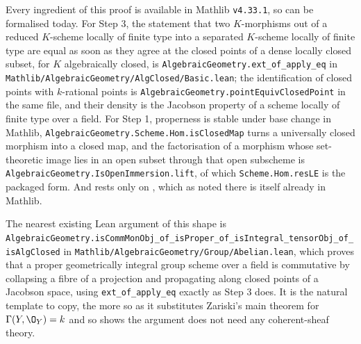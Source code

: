 \begin{remark}\label{rem:cube-rigidity-mathlib}
Every ingredient of this proof is available in Mathlib \texttt{v4.33.1}, so
 can be formalised today.  For Step 3, the statement
that two $K$-morphisms out of a reduced $K$-scheme locally of finite type into
a separated $K$-scheme locally of finite type are equal as soon as they agree
at the closed points of a dense locally closed subset, for $K$ algebraically
closed, is \texttt{AlgebraicGeometry.ext\_of\_apply\_eq} in
\texttt{Mathlib/AlgebraicGeometry/AlgClosed/Basic.lean}; the identification of
closed points with $k$-rational points is
\texttt{AlgebraicGeometry.pointEquivClosedPoint} in the same file, and their
density is the Jacobson property of a scheme locally of finite type over a
field.  For Step 1, properness is stable under base change in Mathlib,
\texttt{AlgebraicGeometry.Scheme.Hom.isClosedMap} turns a universally closed
morphism into a closed map, and the factorisation of a morphism whose
set-theoretic image lies in an open subset through that open subscheme is
\texttt{AlgebraicGeometry.IsOpenImmersion.lift}, of which
\texttt{Scheme.Hom.resLE} is the packaged form.  And
 rests only on
, which as noted there is itself already in
Mathlib.

The nearest existing Lean argument of this shape is
\texttt{AlgebraicGeometry.isCommMonObj\_of\_isProper\_of\_isIntegral\_tensorObj\_of\_isAlgClosed}
in \texttt{Mathlib/AlgebraicGeometry/Group/Abelian.lean}, which proves that a
proper geometrically integral group scheme over a field is commutative by
collapsing a fibre of a projection and propagating along closed points of a
Jacobson space, using \texttt{ext\_of\_apply\_eq} exactly as Step 3 does.  It
is the natural template to copy, the more so as it substitutes Zariski's main
theorem for $\Gamma(Y,\O_Y)=k$ and so shows the argument does not need any
coherent-sheaf theory.
\end{remark}

